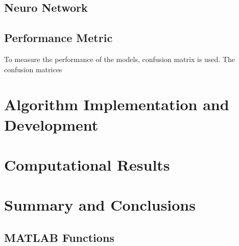 \documentclass{article}
\begin{document}
    \subsection*{Neuro Network}

    \subsection*{Performance Metric}
        To measure the performance of the models, confusion matrix is used. The confusion matrices 


\section{Algorithm Implementation and Development}


\section{Computational Results}
    

\section{Summary and Conclusions}
   
\printbibliography

\begin{appendices}

\section{MATLAB Functions}

    
\end{appendices}
\end{document}
